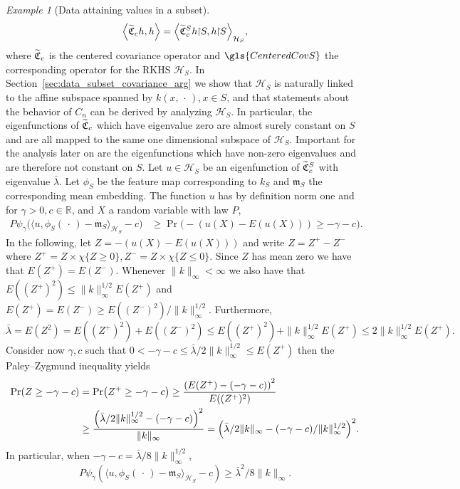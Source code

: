 \documentclass[10pt]{amsart}
\theoremstyle{definition}\newtheorem{defi}[theo]{Definition}\newtheorem{rema}[theo]{Remark}\newtheorem{exam}[theo]{Example}\newtheorem{exem}[theo]{Example}\newtheorem{nota}[theo]{Notation}
\theoremstyle{remark}
\newtheorem{examl}{Example}
\newcommand{\restrr}
{\!\!\upharpoonright\!\!}
\newcommand{\R}{\mathbb{R}}
\newcommand{\cH}{\mathcal{H}}
\newcommand{\fkC}{\mathfrak{C}}
\newcommand{\mean}{\mathfrak{m}}
\let\oldtilde\tilde
\renewcommand*{\tilde}[1]{\mathchoice{\widetilde{#1}}{\widetilde{#1}}{\oldtilde{#1}}{\oldtilde{#1}}}
\let\originalleft\left
\let\originalright\right
\renewcommand{\left}{\mathopen{}\mathclose\bgroup\originalleft}
\renewcommand{\right}{\aftergroup\egroup\originalright}
\begin{document}
\begin{examl}[{Data attaining values in a subset}]
\[
\left\langle \tilde{\fkC}_c h,h \right\rangle = \left\langle \tilde{\fkC}^S_c h\restrr S, h\restrr S\right\rangle_{\cH_S},
\]
where $\tilde{\fkC}_c$ is the centered covariance operator and $\gls{CenteredCovS}$ the corresponding operator for the RKHS $\cH_S$. In Section~\ref{sec:data_subset_covariance_arg} we show that $\cH_S$ is naturally linked to the affine subspace spanned by $k(x,\,\cdot\,), x\in S$, and that statements about the behavior of $C_n$ can be derived by analyzing $\cH_S$. In particular, the eigenfunctions of $\tilde{\fkC}_c$ which have eigenvalue zero are almost surely constant on $S$ and are all mapped to the same one dimensional subspace of $\cH_S$. Important for the analysis later on are the eigenfunctions which have non-zero eigenvalues and are therefore not constant on $S$. Let $u \in \cH_S$ be an eigenfunction of $\tilde{\fkC}_c^S$ with eigenvalue $\bar \lambda$. Let $\phi_S$ be the feature map corresponding to $k_S$ and $\mean_S$ the corresponding mean embedding. The function $u$ has by definition norm one and for $\gamma > 0, c \in \R$, and $X$ a random variable with law $P$,
\begin{align*}
P\psi_\gamma\bigl(\langle u,\phi_S(\,\cdot\,) - \mean_S \rangle_{\cH_S} -c\bigr) &
\geq \Pr\bigl(- (u(X) - E(u(X))) \geq - \gamma - c\bigr).
\end{align*}
In the following, let $Z = - (u(X) - E(u(X)))$ and write $Z = Z^+ - Z^-$ where $Z^+ = Z \times \chi\{Z \geq 0\}, Z^-= Z \times \chi\{Z \leq 0\}$. Since $Z$ has mean zero we have that $E(Z^+) = E(Z^-)$. Whenever $\|k\|_\infty < \infty$ we also have that $E((Z^+)^2) \leq \|k\|_\infty^{1/2} E(Z^+)$ and $E(Z^+) = E(Z^-) \geq E((Z^-)^2) / \|k\|_\infty^{1/2}$. Furthermore,
\[
\bar \lambda = E(Z^2) = E((Z^+)^2) + E((Z^-)^2) \leq E((Z^+)^2) + \|k\|_\infty^{1/2} E(Z^+) \leq 2 \|k\|_\infty^{1/2} E(Z^+).
\]
Consider now $\gamma,c$ such that $ 0 < -\gamma -c \leq \bar \lambda /2 \|k\|_\infty^{1/2}
\leq E(Z^+)$ then the Paley--Zygmund inequality yields
\begin{align*}
\Pr(Z \geq -\gamma - c) &= \Pr\left(Z^+ \geq -\gamma -c\right) \geq \frac{\left(E(Z^+) - (-\gamma -c)\right)^2}{E\left((Z^+)^2\right)} \\
&\geq \frac{\left(\bar \lambda/2 \|k\|_\infty^{1/2} - (-\gamma -c)\right)^2}{\|k\|_\infty} = \left(\bar \lambda/2 \|k\|_\infty - (-\gamma -c)/\|k\|_\infty^{1/2}\right)^2.
\end{align*}
In particular, when $-\gamma -c = \bar \lambda /8\|k\|_\infty^{1/2}$,
\begin{equation}\label{eq:lbnd_P_cov}
P\psi_\gamma(\langle u,\phi_S(\,\cdot\,) - \mean_S \rangle_{\cH_S} -c)
\geq \bar \lambda^2/8\|k\|_\infty.
\end{equation}
\end{examl}
\end{document}
